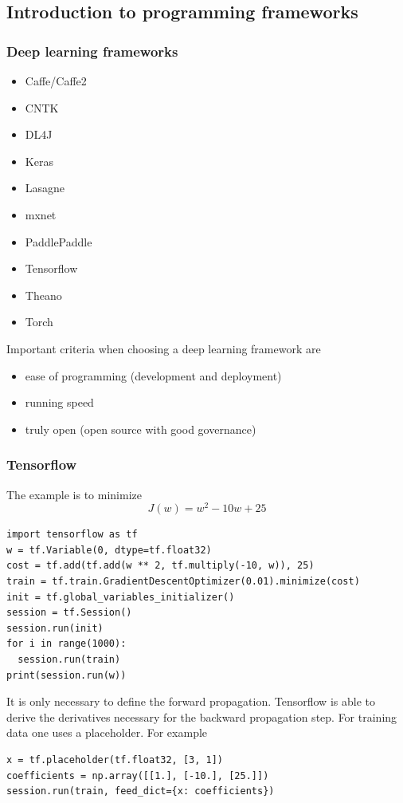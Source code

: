 \documentclass{article}
\begin{document}
\subsection{Introduction to programming frameworks}
\subsubsection{Deep learning frameworks}
\begin{itemize}
  \item Caffe/Caffe2
  \item CNTK
  \item DL4J
  \item Keras
  \item Lasagne
  \item mxnet
  \item PaddlePaddle
  \item Tensorflow
  \item Theano
  \item Torch
\end{itemize}
Important criteria when choosing a deep learning framework are
\begin{itemize}
  \item ease of programming (development and deployment)
  \item running speed
  \item truly open (open source with good governance)
\end{itemize}

\subsubsection{Tensorflow}
The example is to minimize
\begin{equation}
  J(w)=w^2-10w+25
\end{equation}
\begin{verbatim}
import tensorflow as tf
w = tf.Variable(0, dtype=tf.float32)
cost = tf.add(tf.add(w ** 2, tf.multiply(-10, w)), 25)
train = tf.train.GradientDescentOptimizer(0.01).minimize(cost)
init = tf.global_variables_initializer()
session = tf.Session()
session.run(init)
for i in range(1000):
  session.run(train)
print(session.run(w))
\end{verbatim}
It is only necessary to define the forward propagation.
Tensorflow is able to derive the derivatives necessary for the backward propagation step.
For training data one uses a placeholder. For example
\begin{verbatim}
x = tf.placeholder(tf.float32, [3, 1])
coefficients = np.array([[1.], [-10.], [25.]])
session.run(train, feed_dict={x: coefficients})
\end{verbatim}
\end{document}
